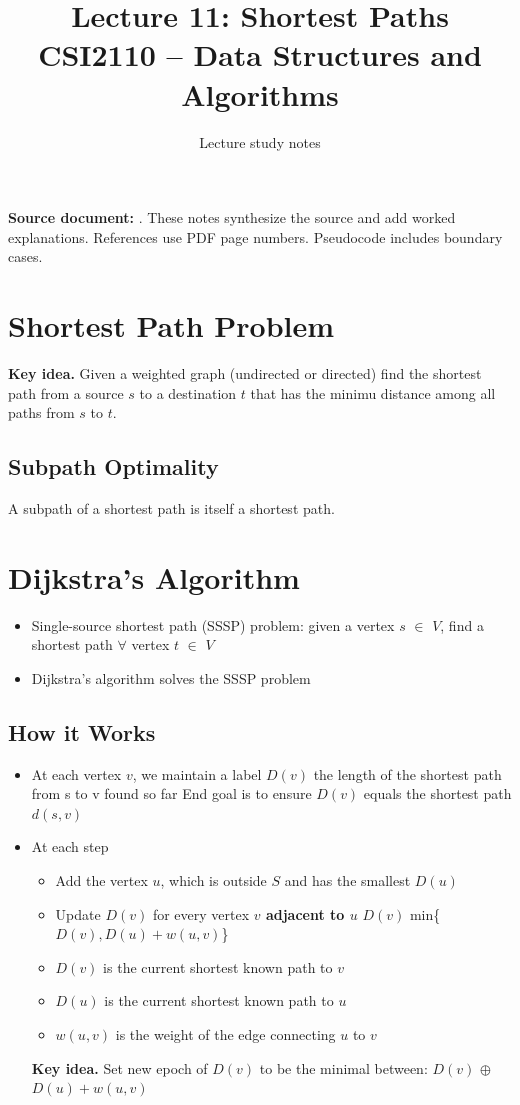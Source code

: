 \documentclass[11pt,letterpaper]{article}
\title{\textbf{Lecture 11: Shortest Paths}\\\large CSI2110 -- Data Structures and Algorithms}\author{Lecture study notes}\date{}
\newcommand{\keyidea}[1]{\par\textbf{Key idea.} #1\par}
\begin{document}
\maketitle
\textbf{Source document:} . These notes synthesize the source and add worked explanations. References use PDF page numbers. Pseudocode includes boundary cases.
\tableofcontents\newpage
\section{Shortest Path Problem}
\keyidea{Given a weighted graph (undirected or directed) find the shortest path from a source $s$ to a destination $t$ that has the minimu distance among all paths from $s$ to $t$.}
\subsection{Subpath Optimality}
A subpath of a shortest path is itself a shortest path.

\section{Dijkstra's Algorithm}
\begin{itemize}
    \item Single-source shortest path (SSSP) problem: given a vertex $s$ $\in$ $V$, find a shortest path $\forall$ vertex $t$ $\in$ $V$
    \item Dijkstra's algorithm solves the SSSP problem
\end{itemize}

\subsection{How it Works}
\begin{itemize}
    \item At each vertex $v$, we maintain a label
    \subitem $D(v)$ the length of the shortest path from s to v found so far
    \subitem End goal is to ensure $D(v)$ equals the shortest path $d(s,v)$
\end{itemize}

\begin{itemize}
    \item At each step
    \begin{itemize}
        \item Add the vertex $u$, which is outside $S$ and has the smallest $D(u)$
        \item Update $D(v)$ for every vertex \textbf{$v$ adjacent to $u$}
        \subitem $D(v)$ \textleftarrow min\{$D(v),D(u) + w(u,v)$\} 
        \item $D(v)$ is the current shortest known path to $v$
        \item $D(u)$ is the current shortest known path to $u$
        \item $w(u,v)$ is the weight of the edge connecting $u$ to $v$
    \end{itemize}
    \subsubitem \keyidea{Set new epoch of $D(v)$ to be the minimal between: $D(v)$ $\oplus$ $D(u) + w(u,v)$}
\end{itemize}
\end{document}
